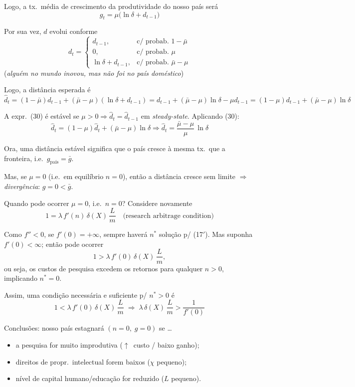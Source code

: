 \documentclass[a4paper,12pt]{article}[abntex2]
\begin{document}
Logo, a tx.\ média de crescimento da produtividade do nosso país será
\[
g_{t}=\mu\bigl(\ln\delta+d_{t-1}\bigr)
\tag{28}
\]

Por sua vez, $d$ evolui conforme
\[
d_{t}=
\begin{cases}
d_{t-1}, & \text{c/ probab.\ }1-\bar{\mu}\\[4pt]
0,       & \text{c/ probab.\ }\mu\\[4pt]
\ln\delta+d_{t-1}, & \text{c/ probab.\ }\bar{\mu}-\mu
\end{cases}
\tag{29}
\]
(\emph{alguém no mundo inovou, mas não foi no país doméstico})

Logo, a distância esperada é
\[
\hat{d}_{t}
=(1-\bar{\mu})d_{t-1}+(\bar{\mu}-\mu)(\ln\delta+d_{t-1})
=d_{t-1}+(\bar{\mu}-\mu)\ln\delta-\mu d_{t-1}
=(1-\mu)d_{t-1}+(\bar{\mu}-\mu)\ln\delta
\tag{30}
\]

A expr.\ (30) é estável se $\mu>0\Longrightarrow\hat{d}_{t}=\hat{d}_{t-1}$ em \emph{steady-state}.  
Aplicando (30):
\[
\hat{d}_{t}=(1-\mu)\hat{d}_{t}+(\bar{\mu}-\mu)\ln\delta
\Longrightarrow
\hat{d}_{t}=\dfrac{\bar{\mu}-\mu}{\mu}\,\ln\delta
\tag{31}
\]

Ora, uma distância estável significa que o país cresce à mesma tx.\ que a fronteira, i.e.\ $g_{\text{país}}=\bar{g}$.

Mas, se $\mu=0$ (i.e.\ em equilíbrio $n=0$), então a distância cresce sem limite $\Longrightarrow$ \emph{divergência}: $g=0<\bar{g}$.

Quando pode ocorrer $\mu=0$, i.e.\ $n=0$?  
Considere novamente
\[
1=\lambda\,f'(n)\,\delta(X)\,\frac{L}{m}
\tag{17$'$}\quad\text{(research arbitrage condition)}
\]

Como $f''<0$, se $f'(0)=+\infty$, sempre haverá $n^{\ast}$ solução p/ (17$'$).  
Mas suponha $f'(0)<\infty$; então pode ocorrer
\[
1>\lambda\,f'(0)\,\delta(X)\,\frac{L}{m},
\]
ou seja, os custos de pesquisa excedem os retornos para qualquer $n>0$, implicando $n^{\ast}=0$.


Assim, uma condição necessária e suficiente p/ $n^{\ast}>0$ é
\[
1<\lambda\,f'(0)\,\delta(X)\,\frac{L}{m}
\;\Longrightarrow\;
\lambda\,\delta(X)\,\frac{L}{m}>\frac{1}{f'(0)}
\tag{32}
\]

Conclusões: nosso país estagnará $(n=0,\;g=0)$ se …
\begin{itemize}
  \item a pesquisa for muito improdutiva ($\uparrow$~custo / baixo ganho);
  \item direitos de propr.\ intelectual forem baixos ($\chi$ pequeno);
  \item nível de capital humano/educação for reduzido ($L$ pequeno).
\end{itemize}
\end{document}
